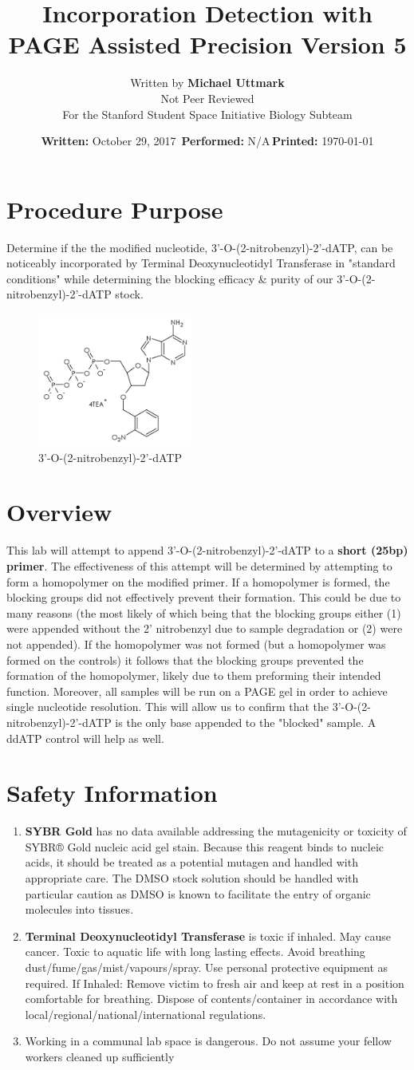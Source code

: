 \documentclass[letterpaper]{article}
\title{\BdATP{} Incorporation Detection with PAGE Assisted Precision Version 5} %
\author{Written by \textbf{Michael Uttmark}\\ %
		Not Peer Reviewed\\%
        For the Stanford Student Space Initiative Biology Subteam}
\date{\textbf{Written:} October 29, 2017 \,\textbf{Performed:} N/A\,\textbf{Printed:} \today{}}
\newenvironment{safety}{%
\begin{tcolorbox}[width=\textwidth, colframe=safetyFrame, arc=1.5mm]
}%
{\end{tcolorbox}}
\newcommand{\tdt}{Terminal Deoxynucleotidyl Transferase}
\newcommand{\BdATP}{3'-O-(2-nitrobenzyl)-2'-dATP}
\newcommand{\SYBRGOLD}{\item{\textbf{SYBR Gold} has no data available addressing the mutagenicity or toxicity of SYBR® Gold nucleic acid gel stain. Because this reagent binds to nucleic acids, it should be treated as a potential mutagen and handled with appropriate care. The DMSO stock solution should be handled with particular caution as DMSO is known to facilitate the entry of organic molecules into tissues.\cite{sybrGold}}}
\newcommand{\tdtSafety}{\item{\textbf{\tdt{}} is toxic if inhaled. May cause cancer. Toxic to aquatic life with long lasting effects. Avoid breathing dust/fume/gas/mist/vapours/spray. Use personal protective equipment as required. If Inhaled: Remove victim to fresh air and keep at rest in a position comfortable for breathing. Dispose of contents/container in accordance with local/regional/national/international regulations.\cite{Invitrogen2002}}}
\begin{document}
\maketitle
\section{Procedure Purpose} %
Determine if the the modified nucleotide, \BdATP{}, can be noticeably incorporated by \tdt{} in "standard conditions" while determining the blocking efficacy \& purity of our \BdATP{} stock.
\begin{figure}[ht]
\centering
\includegraphics[width=2in]{./resources/BdATP-Structure.png}
\caption{\BdATP{}}
\label{bdatp}
\end{figure}
\section{Overview} %
This lab will attempt to append \BdATP{} to a \textbf{short (25bp) primer}. The effectiveness of this attempt will be determined by attempting to form a homopolymer on the modified primer. If a homopolymer is formed, the blocking groups did not effectively prevent their formation. This could be due to many reasons (the most likely of which being that the blocking groups either (1) were appended without the 2' nitrobenzyl due to sample degradation or (2) were not appended). If the homopolymer was not formed (but a homopolymer was formed on the controls) it follows that the blocking groups prevented the formation of the homopolymer, likely due to them preforming their intended function. Moreover, all samples will be run on a PAGE gel in order to achieve single nucleotide resolution. This will allow us to confirm that the \BdATP{} is the only base appended to the "blocked" sample. A ddATP control will help as well.

\section{Safety Information}
\begin{safety}
\begin{enumerate}
\SYBRGOLD{} %
\tdtSafety{}
\item{Working in a communal lab space is dangerous. Do not assume your fellow workers cleaned up sufficiently}
\end{enumerate}
\end{safety}
\end{document}
